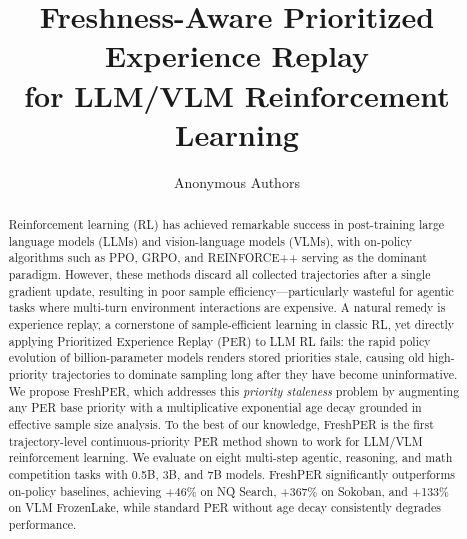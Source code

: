 \documentclass[runningheads]{llncs}
\newcommand{\method}{FreshPER}
\begin{document}
\title{Freshness-Aware Prioritized Experience Replay \\ for LLM/VLM Reinforcement Learning}


\author{Anonymous Authors}

\maketitle

\begin{abstract}
Reinforcement learning (RL) has achieved remarkable success in post-training large language models (LLMs) and vision-language models (VLMs), with on-policy algorithms such as PPO, GRPO, and REINFORCE++ serving as the dominant paradigm. However, these methods discard all collected trajectories after a single gradient update, resulting in poor sample efficiency---particularly wasteful for agentic tasks where multi-turn environment interactions are expensive. A natural remedy is experience replay, a cornerstone of sample-efficient learning in classic RL, yet directly applying Prioritized Experience Replay (PER) to LLM RL fails: the rapid policy evolution of billion-parameter models renders stored priorities stale, causing old high-priority trajectories to dominate sampling long after they have become uninformative. We propose \method{}, which addresses this \emph{priority staleness} problem by augmenting any PER base priority with a multiplicative exponential age decay grounded in effective sample size analysis. To the best of our knowledge, \method{} is the first trajectory-level continuous-priority PER method shown to work for LLM/VLM reinforcement learning. We evaluate on eight multi-step agentic, reasoning, and math competition tasks with 0.5B, 3B, and 7B models. \method{} significantly outperforms on-policy baselines, achieving +46\% on NQ Search, +367\% on Sokoban, and +133\% on VLM FrozenLake, while standard PER without age decay consistently degrades performance.



\end{abstract}
\end{document}
